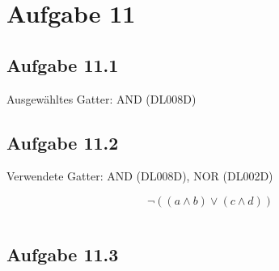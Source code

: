 \chapter{Aufgabe 11}
\section{Aufgabe 11.1}
	Ausgewähltes Gatter: AND (DL008D)
	

\newpage
\section{Aufgabe 11.2}

Verwendete Gatter: AND (DL008D), NOR (DL002D)

\[\neg{((a \land b) \lor (c \land d))}\]
	
\fontsize{10pt}{10pt}\inputminted[linenos=true, breaklines]{cpp}{../task11/main.cpp}

\section{Aufgabe 11.3}